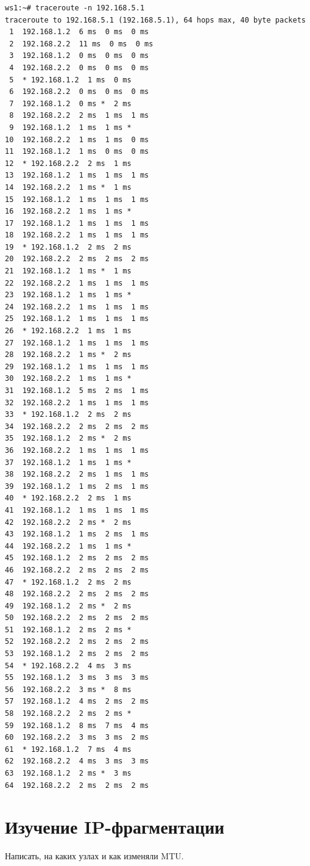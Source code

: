 \documentclass[a4paper,12pt]{article}
\begin{document}
\begin{Verbatim}
ws1:~# traceroute -n 192.168.5.1
traceroute to 192.168.5.1 (192.168.5.1), 64 hops max, 40 byte packets
 1  192.168.1.2  6 ms  0 ms  0 ms
 2  192.168.2.2  11 ms  0 ms  0 ms
 3  192.168.1.2  0 ms  0 ms  0 ms
 4  192.168.2.2  0 ms  0 ms  0 ms
 5  * 192.168.1.2  1 ms  0 ms
 6  192.168.2.2  0 ms  0 ms  0 ms
 7  192.168.1.2  0 ms *  2 ms
 8  192.168.2.2  2 ms  1 ms  1 ms
 9  192.168.1.2  1 ms  1 ms *
10  192.168.2.2  1 ms  1 ms  0 ms
11  192.168.1.2  1 ms  0 ms  0 ms
12  * 192.168.2.2  2 ms  1 ms
13  192.168.1.2  1 ms  1 ms  1 ms
14  192.168.2.2  1 ms *  1 ms
15  192.168.1.2  1 ms  1 ms  1 ms
16  192.168.2.2  1 ms  1 ms *
17  192.168.1.2  1 ms  1 ms  1 ms
18  192.168.2.2  1 ms  1 ms  1 ms
19  * 192.168.1.2  2 ms  2 ms
20  192.168.2.2  2 ms  2 ms  2 ms
21  192.168.1.2  1 ms *  1 ms
22  192.168.2.2  1 ms  1 ms  1 ms
23  192.168.1.2  1 ms  1 ms *
24  192.168.2.2  1 ms  1 ms  1 ms
25  192.168.1.2  1 ms  1 ms  1 ms
26  * 192.168.2.2  1 ms  1 ms
27  192.168.1.2  1 ms  1 ms  1 ms
28  192.168.2.2  1 ms *  2 ms
29  192.168.1.2  1 ms  1 ms  1 ms
30  192.168.2.2  1 ms  1 ms *
31  192.168.1.2  5 ms  2 ms  1 ms
32  192.168.2.2  1 ms  1 ms  1 ms
33  * 192.168.1.2  2 ms  2 ms
34  192.168.2.2  2 ms  2 ms  2 ms
35  192.168.1.2  2 ms *  2 ms
36  192.168.2.2  1 ms  1 ms  1 ms
37  192.168.1.2  1 ms  1 ms *
38  192.168.2.2  2 ms  1 ms  1 ms
39  192.168.1.2  1 ms  2 ms  1 ms
40  * 192.168.2.2  2 ms  1 ms
41  192.168.1.2  1 ms  1 ms  1 ms
42  192.168.2.2  2 ms *  2 ms
43  192.168.1.2  1 ms  2 ms  1 ms
44  192.168.2.2  1 ms  1 ms *
45  192.168.1.2  2 ms  2 ms  2 ms
46  192.168.2.2  2 ms  2 ms  2 ms
47  * 192.168.1.2  2 ms  2 ms
48  192.168.2.2  2 ms  2 ms  2 ms
49  192.168.1.2  2 ms *  2 ms
50  192.168.2.2  2 ms  2 ms  2 ms
51  192.168.1.2  2 ms  2 ms *
52  192.168.2.2  2 ms  2 ms  2 ms
53  192.168.1.2  2 ms  2 ms  2 ms
54  * 192.168.2.2  4 ms  3 ms
55  192.168.1.2  3 ms  3 ms  3 ms
56  192.168.2.2  3 ms *  8 ms
57  192.168.1.2  4 ms  2 ms  2 ms
58  192.168.2.2  2 ms  2 ms *
59  192.168.1.2  8 ms  7 ms  4 ms
60  192.168.2.2  3 ms  3 ms  2 ms
61  * 192.168.1.2  7 ms  4 ms
62  192.168.2.2  4 ms  3 ms  3 ms
63  192.168.1.2  2 ms *  3 ms
64  192.168.2.2  2 ms  2 ms  2 ms
\end{Verbatim}


\section{Изучение IP-фрагментации}

Написать, на каких узлах и как изменяли MTU.
\end{document}
